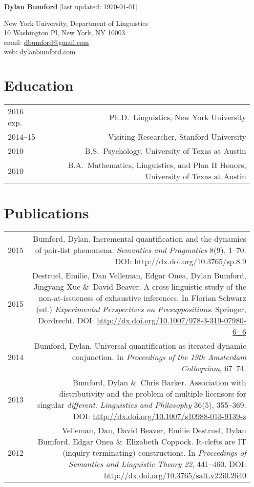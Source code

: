 \documentclass[11pt]{article}
\newcommand{\doi}[1]{\url{http://dx.doi.org/#1}}
\newcommand{\with}{\&}
\begin{document}
\textbf{Dylan Bumford}\hfill
{\color{gray}[last updated: \today]}

\bigskip

New York University, Department of Linguistics\\
10 Washington Pl, New York, NY 10003\\
email: \href{mailto:dbumford@gmail.com}{dbumford@gmail.com}\\
web: \url{dylanbumford.com}


\section*{Education}

\begin{longtable}{LR}
  2016 exp.   & Ph.D.~Linguistics, New York University\\
  2014--15    & Visiting Researcher, Stanford University\\
  2010        & B.S.~Psychology, University of Texas at Austin\\
  2010        & B.A.~Mathematics, Linguistics, and Plan II Honors, University of
                Texas at Austin
\end{longtable}

\section*{Publications}

\begin{longtable}{LR}
  2015 & Bumford, Dylan. Incremental quantification and the dynamics of
         pair-list phenomena. \textit{Semantics and Pragmatics} 8(9), 1--70.
         DOI: \doi{10.3765/sp.8.9}\\
  2015 & Destruel, Emilie, Dan Velleman, Edgar Onea, Dylan Bumford, Jingyang Xue
         \with~David Beaver. A cross-linguistic study of the non-at-issueness
         of exhaustive inferences. In Florian Schwarz (ed.)
         \textit{Experimental Perspectives on Presuppositions}. Springer,
         Dordrecht. DOI: \doi{10.1007/978-3-319-07980-6_6}\\
  2014 & Bumford, Dylan. Universal quantification as iterated dynamic
         conjunction. In \textit{Proceedings of the 19th Amsterdam
         Colloquium}, 67--74.\\
  2013 & Bumford, Dylan \with~Chris Barker. Association with distributivity
         and the problem of multiple licensors for singular
         \textit{different}. \textit{Linguistics and Philosophy} 36(5),
         355--369. DOI: \doi{10.1007/s10988-013-9139-z}\\ %
  2012 & Velleman, Dan, David Beaver, Emilie Destruel, Dylan Bumford, Edgar
         Onea \with~Elizabeth Coppock. It-clefts are IT (inquiry-terminating)
         constructions. In \textit{Proceedings of Semantics and Linguistic
         Theory 22}, 441--460. DOI: \doi{10.3765/salt.v22i0.2640}
\end{longtable}
\end{document}
